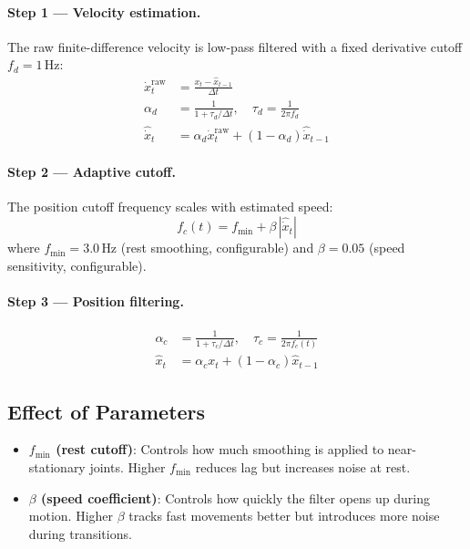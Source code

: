 \documentclass[11pt,a4paper]{article}
\begin{document}
\paragraph{Step 1 — Velocity estimation.} The raw finite-difference velocity is
low-pass filtered with a fixed derivative cutoff $f_d = 1\,\text{Hz}$:
\begin{align}
  \dot{x}_t^\text{raw} &= \frac{x_t - \hat{x}_{t-1}}{\Delta t} \\
  \alpha_d &= \frac{1}{1 + \tau_d / \Delta t}, \quad \tau_d = \frac{1}{2\pi f_d} \\
  \hat{\dot{x}}_t &= \alpha_d \dot{x}_t^\text{raw} + (1 - \alpha_d)\hat{\dot{x}}_{t-1}
\end{align}

\paragraph{Step 2 — Adaptive cutoff.} The position cutoff frequency scales with
estimated speed:
\begin{equation}
  f_c(t) = f_{\min} + \beta\,|\hat{\dot{x}}_t|
  \label{eq:adaptive_cutoff}
\end{equation}
where $f_{\min} = 3.0\,\text{Hz}$ (rest smoothing, configurable) and
$\beta = 0.05$ (speed sensitivity, configurable).

\paragraph{Step 3 — Position filtering.}
\begin{align}
  \alpha_c &= \frac{1}{1 + \tau_c / \Delta t}, \quad \tau_c = \frac{1}{2\pi f_c(t)} \\
  \hat{x}_t &= \alpha_c x_t + (1 - \alpha_c)\hat{x}_{t-1}
\end{align}

\subsection{Effect of Parameters}

\begin{itemize}
  \item \textbf{$f_{\min}$ (rest cutoff)}: Controls how much smoothing is applied to
    near-stationary joints. Higher $f_{\min}$ reduces lag but increases noise at rest.
  \item \textbf{$\beta$ (speed coefficient)}: Controls how quickly the filter opens up
    during motion. Higher $\beta$ tracks fast movements better but introduces more
    noise during transitions.
\end{itemize}
\end{document}
